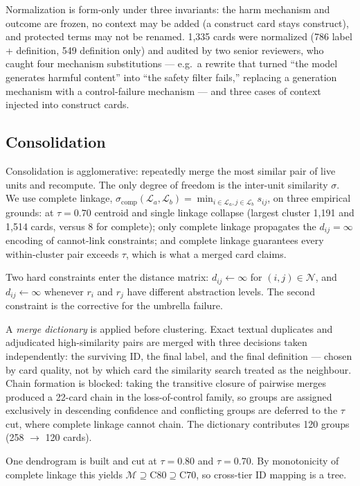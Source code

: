 \documentclass[11pt,a4paper]{article}
\newcommand{\cL}{\mathcal{L}}
\newcommand{\cM}{\mathcal{M}}
\newcommand{\cN}{\mathcal{N}}
\begin{document}
Normalization is form-only under three invariants: the harm mechanism and outcome are frozen, no context may be added (a construct card stays construct), and protected terms may not be renamed. 1{,}335 cards were normalized (786 label + definition, 549 definition only) and audited by two senior reviewers, who caught four mechanism substitutions --- e.g.\ a rewrite that turned ``the model generates harmful content'' into ``the safety filter fails,'' replacing a generation mechanism with a control-failure mechanism --- and three cases of context injected into construct cards.

\subsection{Consolidation}

Consolidation is agglomerative: repeatedly merge the most similar pair of live units and recompute. The only degree of freedom is the inter-unit similarity $\sigma$. We use complete linkage, $\sigma_{\mathrm{comp}}(\cL_a,\cL_b)=\min_{i\in\cL_a,j\in\cL_b} s_{ij}$, on three empirical grounds: at $\tau=0.70$ centroid and single linkage collapse (largest cluster 1{,}191 and 1{,}514 cards, versus 8 for complete); only complete linkage propagates the $d_{ij}=\infty$ encoding of cannot-link constraints; and complete linkage guarantees every within-cluster pair exceeds $\tau$, which is what a merged card claims.

Two hard constraints enter the distance matrix: $d_{ij}\leftarrow\infty$ for $(i,j)\in\cN$, and $d_{ij}\leftarrow\infty$ whenever $r_i$ and $r_j$ have different abstraction levels. The second constraint is the corrective for the umbrella failure.

A \emph{merge dictionary} is applied before clustering. Exact textual duplicates and adjudicated high-similarity pairs are merged with three decisions taken independently: the surviving ID, the final label, and the final definition --- chosen by card quality, not by which card the similarity search treated as the neighbour. Chain formation is blocked: taking the transitive closure of pairwise merges produced a 22-card chain in the loss-of-control family, so groups are assigned exclusively in descending confidence and conflicting groups are deferred to the $\tau$ cut, where complete linkage cannot chain. The dictionary contributes 120 groups (258 $\to$ 120 cards).

One dendrogram is built and cut at $\tau=0.80$ and $\tau=0.70$. By monotonicity of complete linkage this yields $\cM \supseteq \mathrm{C80} \supseteq \mathrm{C70}$, so cross-tier ID mapping is a tree.
\end{document}
